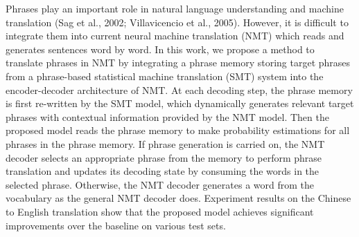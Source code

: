 Phrases play an important role in natural language understanding and machine translation (Sag et al., 2002; Villavicencio et al., 2005). However, it is difficult to integrate them into current neural machine translation (NMT) which reads and generates sentences word by word. In this work, we propose a method to translate phrases in NMT by integrating a phrase memory storing target phrases from a phrase-based statistical machine translation (SMT) system into the encoder-decoder architecture of NMT. At each decoding step, the phrase memory is first re-written by the SMT model, which dynamically generates relevant target phrases with contextual information provided by the NMT model. Then the proposed model reads the phrase memory to make probability estimations for all phrases in the phrase memory. If phrase generation is carried on, the NMT decoder selects an appropriate phrase from the memory to perform phrase translation and updates its decoding state by consuming the words in the selected phrase. Otherwise, the NMT decoder generates a word from the vocabulary as the general NMT decoder does. Experiment results on the Chinese to English translation show that the proposed model achieves significant improvements over the baseline on various test sets.

